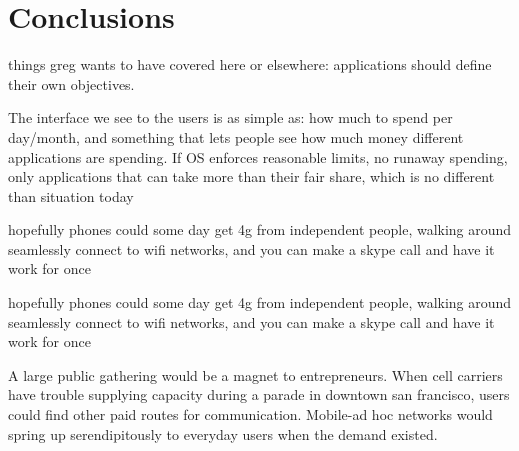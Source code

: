 \section{Conclusions}
things greg wants to have covered here or elsewhere:
applications should define their own objectives.

The interface we see to the users is as simple as: how much to spend per day/month, and something that lets people see how much money different applications are spending. If OS enforces reasonable limits, no runaway spending, only applications that can take more than their fair share, which is no different than situation today

hopefully phones could some day get 4g from independent people, walking around seamlessly connect to wifi networks, and you can make a skype call and have it work for once

hopefully phones could some day get 4g from independent people, walking around seamlessly connect to wifi networks, and you can make a skype call and have it work for once

A large public gathering would be a magnet to entrepreneurs. When cell carriers have trouble supplying capacity during a parade in downtown san francisco, users could find other paid routes for communication. Mobile-ad hoc networks would spring up serendipitously to everyday users when the demand existed.
\label{sec:conc}
